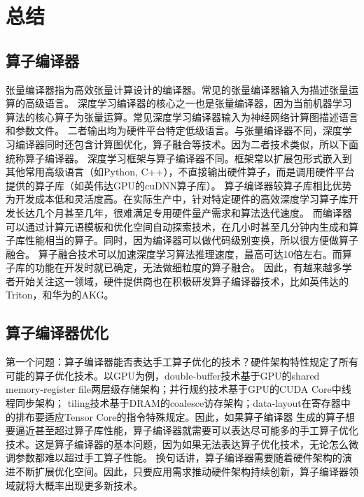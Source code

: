
\chapter{总结}

\section{算子编译器}
张量编译器指为高效张量计算设计的编译器\cite{halide,kjolstad:2017:taco}。常见的张量编译器输入为描述张量运算的高级语言。
深度学习编译器\cite{tvm,rammer}的核心之一也是张量编译器，因为当前机器学习算法的核心算子为张量运算。常见深度学习编译器输入为神经网络计算图描述语言和参数文件。
二者输出均为硬件平台特定低级语言。与张量编译器不同，深度学习编译器同时还包含计算图优化，算子融合等技术。因为二者技术类似，所以下面统称算子编译器。
深度学习框架\cite{tensorflow,pytorch}与算子编译器不同。框架常以扩展包形式嵌入到其他常用高级语言（如Python, C++），不直接输出硬件算子，而是调用硬件平台提供的算子库（如英伟达GPU的cuDNN算子库\cite{cuDNN}）。
算子编译器较算子库相比优势为开发成本低和灵活度高。在实际生产中，针对特定硬件的高效深度学习算子库开发长达几个月甚至几年，很难满足专用硬件量产需求和算法迭代速度\cite{Heron}。
而编译器可以通过计算元语模板和优化空间自动探索技术，在几小时甚至几分钟内生成和算子库性能相当的算子\cite{Roller}。同时，因为编译器可以做代码级别变换，所以很方便做算子融合。
算子融合技术可以加速深度学习算法推理速度，最高可达10倍左右\cite{DNNFusion}。而算子库的功能在开发时就已确定，无法做细粒度的算子融合\cite{Graphene}。
因此，有越来越多学者开始关注这一领域\cite{PET,Tiramisu,Checkmate}，硬件提供商也在积极研发算子编译器技术，比如英伟达的Triton\cite{Triton}，和华为的AKG\cite{AKG}。

\section{算子编译器优化}
第一个问题：算子编译器能否表达手工算子优化的技术？硬件架构特性规定了所有可能的算子优化技术。以GPU为例，double-buffer技术基于GPU的shared memory-register file两层级存储架构\cite{double-buffer}；并行规约技术基于GPU的CUDA Core中线程同步架构\cite{parallel-reduction}；
tiling技术基于DRAM的coalesce访存架构\cite{Roller}；data-layout在寄存器中的排布要适应Tensor Core的指令特殊规定\cite{DynamicNM}。因此，如果算子编译器
生成的算子想要逼近甚至超过算子库性能，算子编译器就需要可以表达尽可能多的手工算子优化技术。这是算子编译器的基本问题，因为如果无法表达算子优化技术，无论怎么微调参数都难以超过手工算子性能。
换句话讲，算子编译器需要随着硬件架构的演进不断扩展优化空间。因此，只要应用需求推动硬件架构持续创新，算子编译器领域就将大概率出现更多新技术。

